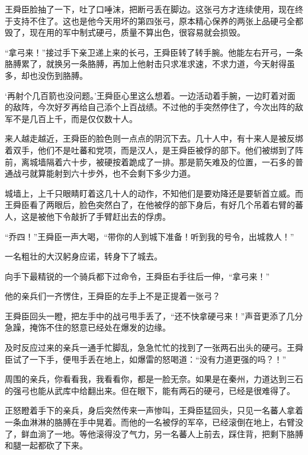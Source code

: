 王舜臣脸抽了一下，吐了口唾沫，把断弓丢在脚边。这张弓方才连续使用，现在终于支持不住了。这也是他今天用坏的第四张弓，原本精心保养的两张上品硬弓全都毁了，现在用的军中制式硬弓，质量不算出色，很容易就会损毁。

“拿弓来！”接过手下亲卫递上来的长弓，王舜臣转了转手腕。他能左右开弓，一条胳膊累了，就换另一条胳膊，再加上他射击只求准求速，不求力道，今天射得虽多，却也没伤到胳膊。

‘再射个几百箭也没问题。’王舜臣心里这么想着。一边活动着手腕，一边盯着对面的敌阵，今次好歹再给自己添个上百战绩。不过他的手突然停住了，今次出阵的敌军不是几百上千，而是仅仅数十人。

来人越走越近，王舜臣的脸色则一点点的阴沉下去。几十人中，有十来人是被反绑着双手，他们不是吐蕃和党项，而是汉人，是王舜臣被俘的部下。他们被绑到了阵前，离城墙隔着六十步，被硬按着跪成了一排。那是箭矢难及的位置，一石多的普通战弓就算能射到六十步外，也不会剩下多少力道。

城墙上，上千只眼睛盯着这几十人的动作，不知他们是要劝降还是要斩首立威。而王舜臣看了两眼后，脸色突然白了，在他被俘的部下身后，有好几个吊着右臂的蕃人，这是被他下令敲折了手臂赶出去的俘虏。

“乔四！”王舜臣一声大喝，“带你的人到城下准备！听到我的号令，出城救人！”

一名粗壮的大汉躬身应诺，转身下了城去。

向手下最精锐的一个骑兵都下过命令，王舜臣右手往后一伸，“拿弓来！”

他的亲兵们一齐愣住，王舜臣的左手上不是正提着一张弓？

王舜臣回头一瞪，把左手中的战弓甩手丢了，“还不快拿硬弓来！”声音更添了几分急躁，掩饰不住的怒意已经处在爆发的边缘。

及时反应过来的亲兵一通手忙脚乱，急急忙忙的找到了一张两石出头的硬弓。王舜臣试了一下手，便甩手丢在地上，如爆雷的怒喝道：“没有力道更强的吗？！”

周围的亲兵，你看看我，我看看你，都是一脸无奈。如果是在秦州，力道达到三石的强弓也能从武库中给翻出来。但在眼下，能有两石的硬弓，已经是很难得了。

正怒瞪着手下的亲兵，身后突然传来一声惨叫，王舜臣猛回头，只见一名蕃人拿着一条血淋淋的胳膊在手中晃着。而他的一名被俘的军卒，已经滚倒在地上，右臂没了，鲜血淌了一地。等他滚得没了气力，另一名蕃人上前去，踩住背，把剩下胳膊和腿一起都砍了下来。

